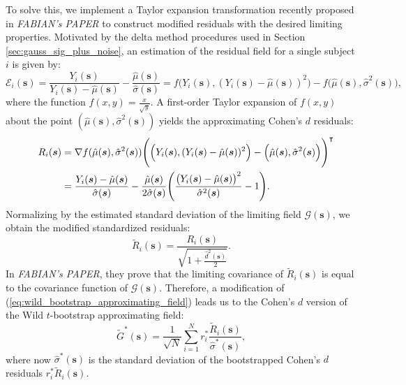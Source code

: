 To solve this, we implement a Taylor expansion transformation recently proposed in \textit{FABIAN's PAPER} to construct modified residuals with the desired limiting properties. Motivated by the delta method procedures used in Section \ref{sec:gauss_sig_plus_noise}, an estimation of the residual field for a single subject $i$ is given by:
\begin{equation}
\label{eq:single_subject_residuals}
\mathcal{E}_{i}(\bm{s}) = \frac{Y_{i}(\bm{s})}{Y_{i}(\bm{s}) - \hat{\mu}(\bm{s})} - \frac{\hat{\mu}(\bm{s})}{\hat{\sigma}(\bm{s})} = f\Big(Y_{i}(\bm{s}),(Y_{i}(\bm{s}) - \hat{\mu}(\bm{s}))^{2}\Big) - f\Big(\hat{\mu}(\bm{s}), \hat{\sigma}^{2}(\bm{s})\Big),
\end{equation}
where the function $f(x,y) = \frac{x}{\sqrt{y}}$. A first-order Taylor expansion of $f(x,y)$ about the point $(\hat{\mu}(\bm{s}), \hat{\sigma}^{2}(\bm{s}))$ yields the approximating Cohen's $d$ residuals:
\begin{alignat}{4}
\label{eq:approximating_residuals}
&&R_{i}(\bm{s})
&= \nabla f(\hat{\mu}(\bm{s}),\hat{\sigma}^{2}(\bm{s}))\Bigg( \Big(Y_{i}(\bm{s}),(Y_{i}(\bm{s}) - \hat{\mu}(\bm{s}))^{2}\Big) - \Big(\hat{\mu}(\bm{s}), \hat{\sigma}^{2}(\bm{s}) \Big) \Bigg)^{\intercal}\notag\\
&
&
&= \frac{Y_{i}(\bm{s}) - \hat{\mu}(\bm{s})}{\hat{\sigma}(\bm{s})} - \frac{\hat{\mu}(\bm{s})}{2\hat{\sigma}(\bm{s})}\Bigg( \frac{\big(Y_{i}(\bm{s}) - \hat{\mu}(\bm{s})\big)^{2}}{\hat{\sigma}^{2}(\bm{s})} - 1 \Bigg).
\end{alignat}
Normalizing by the estimated standard deviation of the limiting field $\mathcal{G}(\bm{s})$, we obtain the modified standardized residuals:
\begin{equation}
\label{eq:cohens_d_residuals}
\tilde{R}_{i}(\bm{s}) = \frac{R_{i}(\bm{s})}{\sqrt{1 + \frac{\hat{d}^{2}(\bm{s})}{2}}}.
\end{equation}
In \textit{FABIAN's PAPER}, they prove that the limiting covariance of $\tilde{R}_{i}(\bm{s})$ is equal to the covariance function of $\mathcal{G}(\bm{s})$. Therefore, a modification of (\ref{eq:wild_bootstrap_approximating_field}) leads us to the Cohen's  $d$ version of the Wild $t$-bootstrap approximating field:
\begin{equation}
\label{eq:cohen_d_wild_bootstrap_approximating_field}
\tilde{G}^{*}(\bm{s}) = \frac{1}{\sqrt{N}}\sum_{i=1}^{N} r^*_i\frac{\tilde{R}_{i}(\bm{s})}{\hat{\sigma}^*(\bm{s})},
\end{equation}
where now $\hat{\sigma}^*(\bm{s})$ is the standard deviation of the bootstrapped Cohen's $d$ residuals $r_i^{*}\tilde{R}_{i}(\bm{s})$.

